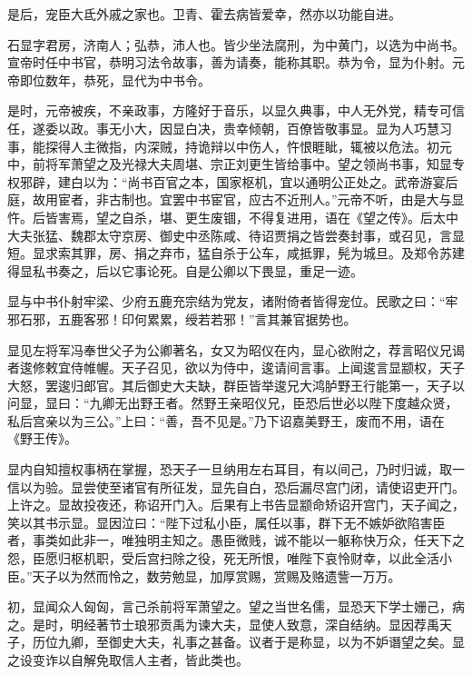 \documentclass[12pt,UTF8]{ctexbook}
\begin{document}
是后，宠臣大氐外戚之家也。卫青、霍去病皆爱幸，然亦以功能自进。



石显字君房，济南人；弘恭，沛人也。皆少坐法腐刑，为中黄门，以选为中尚书。宣帝时任中书官，恭明习法令故事，善为请奏，能称其职。恭为令，显为仆射。元帝即位数年，恭死，显代为中书令。



是时，元帝被疾，不亲政事，方隆好于音乐，以显久典事，中人无外党，精专可信任，遂委以政。事无小大，因显白决，贵幸倾朝，百僚皆敬事显。显为人巧慧习事，能探得人主微指，内深贼，持诡辩以中伤人，忤恨睚眦，辄被以危法。初元中，前将军萧望之及光禄大夫周堪、宗正刘更生皆给事中。望之领尚书事，知显专权邪辟，建白以为：“尚书百官之本，国家枢机，宜以通明公正处之。武帝游宴后庭，故用宦者，非古制也。宜罢中书宦官，应古不近刑人。”元帝不听，由是大与显忤。后皆害焉，望之自杀，堪、更生废锢，不得复进用，语在《望之传》。后太中大夫张猛、魏郡太守京房、御史中丞陈咸、待诏贾捐之皆尝奏封事，或召见，言显短。显求索其罪，房、捐之弃市，猛自杀于公车，咸抵罪，髡为城旦。及郑令苏建得显私书奏之，后以它事论死。自是公卿以下畏显，重足一迹。



显与中书仆射牢梁、少府五鹿充宗结为党友，诸附倚者皆得宠位。民歌之曰：“牢邪石邪，五鹿客邪！印何累累，绶若若邪！”言其兼官据势也。



显见左将军冯奉世父子为公卿著名，女又为昭仪在内，显心欲附之，荐言昭仪兄谒者逡修敕宜侍帷幄。天子召见，欲以为侍中，逡请间言事。上闻逡言显颛权，天子大怒，罢逡归郎官。其后御史大夫缺，群臣皆举逡兄大鸿胪野王行能第一，天子以问显，显曰：“九卿无出野王者。然野王亲昭仪兄，臣恐后世必以陛下度越众贤，私后宫亲以为三公。”上曰：“善，吾不见是。”乃下诏嘉美野王，废而不用，语在《野王传》。



显内自知擅权事柄在掌握，恐天子一旦纳用左右耳目，有以间己，乃时归诚，取一信以为验。显尝使至诸官有所征发，显先自白，恐后漏尽宫门闭，请使诏吏开门。上许之。显故投夜还，称诏开门入。后果有上书告显颛命矫诏开宫门，天子闻之，笑以其书示显。显因泣曰：“陛下过私小臣，属任以事，群下无不嫉妒欲陷害臣者，事类如此非一，唯独明主知之。愚臣微贱，诚不能以一躯称快万众，任天下之怨，臣愿归枢机职，受后宫扫除之役，死无所恨，唯陛下哀怜财幸，以此全活小臣。”天子以为然而怜之，数劳勉显，加厚赏赐，赏赐及赂遗訾一万万。



初，显闻众人匈匈，言己杀前将军萧望之。望之当世名儒，显恐天下学士姗己，病之。是时，明经著节士琅邪贡禹为谏大夫，显使人致意，深自结纳。显因荐禹天子，历位九卿，至御史大夫，礼事之甚备。议者于是称显，以为不妒谮望之矣。显之设变诈以自解免取信人主者，皆此类也。
\end{document}
